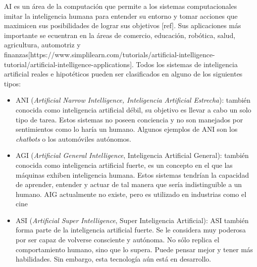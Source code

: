 AI es un área de la computación que permite a los sistemas computacionales imitar la inteligencia humana para entender su entorno y tomar acciones que maximicen sus posibilidades de lograr sus objetivos [ref]. Sus aplicaciones más importante se ecuentran en la áreas de comercio, educación, robótica, salud, agricultura, automotriz y finanzas[https://www.simplilearn.com/tutorials/artificial-intelligence-tutorial/artificial-intelligence-applications]. Todos los sistemas de inteligencia artificial reales e hipotéticos pueden ser clasificados en alguno de los siguientes tipos:
\begin{itemize}
	\item ANI (\textit{Artificial Narrow Intelligence, Inteligencia Artificial Estrecha}): también conocida como inteligencia artificial débil, su objetivo es llevar a cabo un solo tipo de tarea. Estos sistemas no poseen conciencia y no son manejados por sentimientos como lo haría un humano. Algunos ejemplos de ANI son los \textit{chatbots } o los automóviles autónomos.
	\item AGI (\textit{Artificial General Intelligence}, Inteligencia Artificial General): también conocida como inteligencia artificial fuerte, es un concepto en el que las máquinas exhiben inteligencia humana. Estos sistemas tendrían la capacidad de aprender, entender y actuar de tal manera que sería indistinguible a un humano. AIG actualmente no existe, pero es utilizado en industrias como el cine
	\item ASI (\textit{Artificial Super Intelligence}, Super Inteligencia Artificial): ASI también forma parte de la inteligencia artificial fuerte. Se le considera muy poderosa por ser capaz de volverse consciente y autónoma.
No sólo replica el comportamiento humano, sino que lo supera. Puede pensar mejor y tener más habilidades. Sin embargo, esta tecnología aún está en desarrollo.
\end{itemize}

